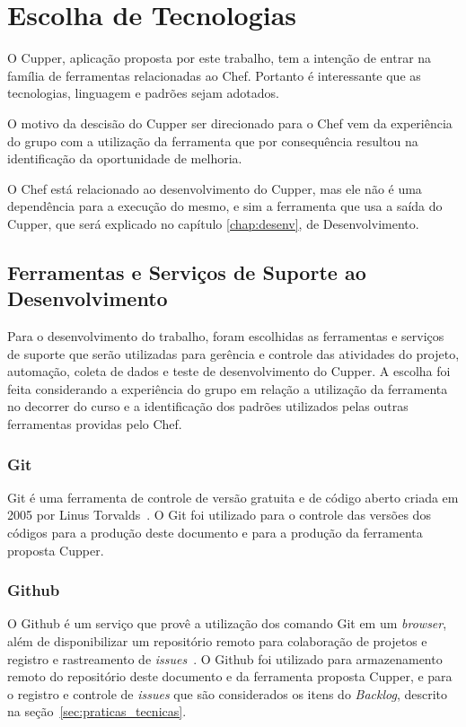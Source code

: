 \section{Escolha de Tecnologias}
\label{sec:tec}

O Cupper, aplicação proposta por este trabalho, tem a intenção de entrar
na família de ferramentas relacionadas ao Chef. Portanto é interessante que
as tecnologias, linguagem e padrões sejam adotados. %

O motivo da descisão do Cupper ser direcionado para o Chef vem da experiência do
grupo com a utilização da ferramenta que por consequência resultou na identificação
da oportunidade de melhoria.

O Chef está relacionado ao desenvolvimento do Cupper, mas ele não é uma
dependência para a execução do mesmo, e sim a ferramenta que usa a saída do Cupper,
que será explicado no capítulo \ref{chap:desenv}, de Desenvolvimento.

\subsection{Ferramentas e Serviços de Suporte ao Desenvolvimento}
\label{sec:supdev}

Para o desenvolvimento do trabalho, foram escolhidas as ferramentas e serviços de suporte que serão
utilizadas para gerência e controle das atividades do projeto, automação, coleta de dados e teste
de desenvolvimento do Cupper. A escolha foi feita considerando a experiência do
grupo em relação a utilização da ferramenta no decorrer do curso e a identificação dos
padrões utilizados pelas outras ferramentas providas pelo Chef.

\subsubsection{Git}
\label{sec:supdev:git}

Git é uma ferramenta de controle de versão gratuita e de código aberto criada
em 2005 por Linus Torvalds~\cite{chacon:2014}. O Git foi utilizado para o controle das versões
dos códigos para a produção deste documento e para a produção da ferramenta proposta Cupper.

\subsubsection{Github}
\label{sec:supdev:github}

O Github é um serviço que provê a utilização dos comando Git em um \textit{browser}, além de
disponibilizar um repositório remoto para colaboração de projetos e registro e rastreamento de
\textit{issues}~\cite{github:2016}.  O Github foi utilizado para armazenamento remoto do repositório
deste documento e da ferramenta proposta Cupper, e para o registro e controle de \textit{issues} que são
considerados os itens do \textit{Backlog}, descrito na seção~\ref{sec:praticas_tecnicas}.

